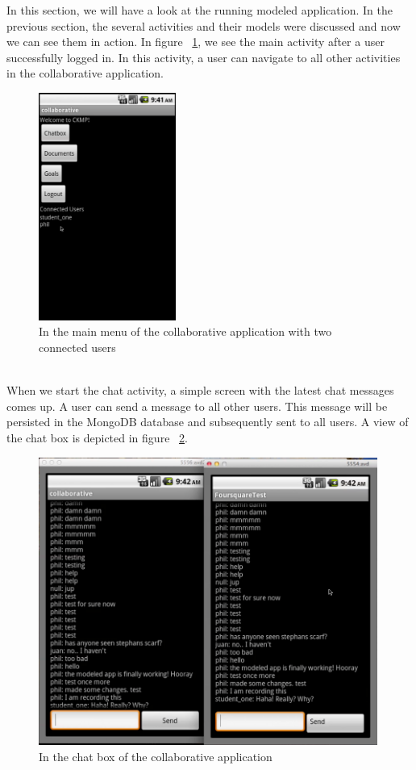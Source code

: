 In this section, we will have a look at the running modeled application. In the previous section, the several activities and their models were discussed and now we can see them in action. In figure ~\ref{fig:coll_connected}, we see the main activity after a user successfully logged in. In this activity, a user can navigate to all other activities in the collaborative application.
\begin{figure}[h!]
\centering
\includegraphics[width=0.4\textwidth]{images/chap7_connected.png}
\caption{In the main menu of the collaborative application with two connected users}
\label{fig:coll_connected}
\end{figure} \\
When we start the chat activity, a simple screen with the latest chat messages comes up. A user can send a message to all other users. This message will be persisted in the MongoDB database and subsequently sent to all users. A view of the chat box is depicted in figure ~\ref{fig:coll_chatbox}. 
\begin{figure}[h!]
\centering
\includegraphics[width=0.99\textwidth]{images/chap7_chatbox.png}
\caption{In the chat box of the collaborative application}
\label{fig:coll_chatbox}
\end{figure} \\ 
